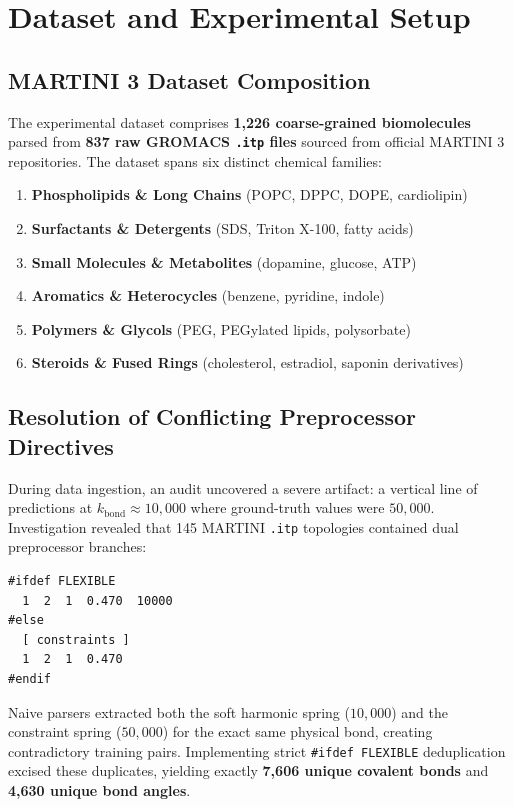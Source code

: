\documentclass[11pt,a4paper]{article}
\begin{document}
\section{Dataset and Experimental Setup}
\label{sec:dataset}

\subsection{MARTINI 3 Dataset Composition}
The experimental dataset comprises \textbf{1,226 coarse-grained biomolecules} parsed from \textbf{837 raw GROMACS \texttt{.itp} files} sourced from official MARTINI 3 repositories. The dataset spans six distinct chemical families:
\begin{enumerate}
    \item \textbf{Phospholipids \& Long Chains} (POPC, DPPC, DOPE, cardiolipin)
    \item \textbf{Surfactants \& Detergents} (SDS, Triton X-100, fatty acids)
    \item \textbf{Small Molecules \& Metabolites} (dopamine, glucose, ATP)
    \item \textbf{Aromatics \& Heterocycles} (benzene, pyridine, indole)
    \item \textbf{Polymers \& Glycols} (PEG, PEGylated lipids, polysorbate)
    \item \textbf{Steroids \& Fused Rings} (cholesterol, estradiol, saponin derivatives)
\end{enumerate}

\subsection{Resolution of Conflicting Preprocessor Directives}
During data ingestion, an audit uncovered a severe artifact: a vertical line of predictions at $k_{\text{bond}} \approx 10{,}000$ where ground-truth values were $50{,}000$. Investigation revealed that 145 MARTINI \texttt{.itp} topologies contained dual preprocessor branches:
\begin{verbatim}
#ifdef FLEXIBLE
  1  2  1  0.470  10000
#else
  [ constraints ]
  1  2  1  0.470
#endif
\end{verbatim}
Naive parsers extracted both the soft harmonic spring ($10{,}000$) and the constraint spring ($50{,}000$) for the exact same physical bond, creating contradictory training pairs. Implementing strict \texttt{\#ifdef FLEXIBLE} deduplication excised these duplicates, yielding exactly \textbf{7,606 unique covalent bonds} and \textbf{4,630 unique bond angles}.
\end{document}
